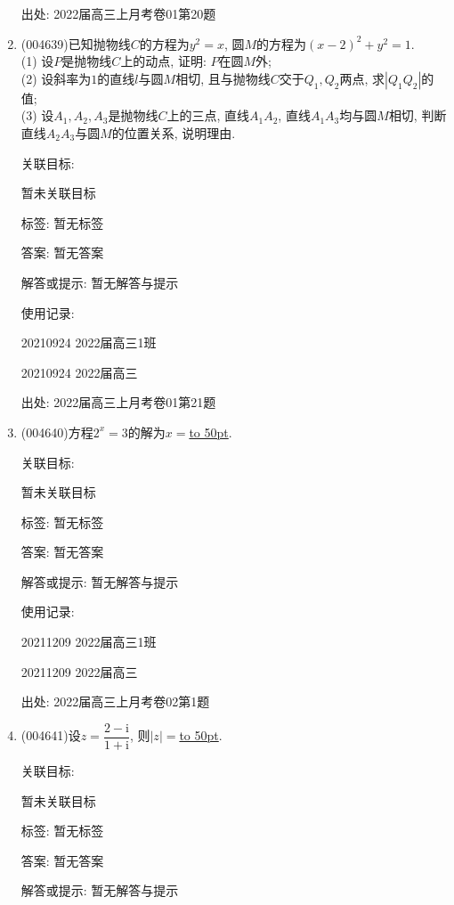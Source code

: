 \documentclass[10pt,a4paper]{article}
\newcommand{\blank}[1]{\underline{\hbox to #1pt{}}}
\begin{document}
\begin{enumerate}[1.]
出处: 2022届高三上月考卷01第20题
\item { (004639)}已知抛物线$C$的方程为$y^2=x$, 圆$M$的方程为$(x-2)^2+y^2=1$.\\
(1) 设$P$是抛物线$C$上的动点, 证明: $P$在圆$M$外;\\
(2) 设斜率为$1$的直线$l$与圆$M$相切, 且与抛物线$C$交于$Q_1,Q_2$两点, 求$|Q_1Q_2|$的值;\\
(3) 设$A_1,A_2,A_3$是抛物线$C$上的三点, 直线$A_1A_2$, 直线$A_1A_3$均与圆$M$相切, 判断直线$A_2A_3$与圆$M$的位置关系, 说明理由.


关联目标:

暂未关联目标



标签: 暂无标签

答案: 暂无答案

解答或提示: 暂无解答与提示

使用记录:

20210924	2022届高三1班			

20210924	2022届高三			


出处: 2022届高三上月考卷01第21题
\item { (004640)}方程$2^x=3$的解为$x=$\blank{50}.


关联目标:

暂未关联目标



标签: 暂无标签

答案: 暂无答案

解答或提示: 暂无解答与提示

使用记录:

20211209	2022届高三1班	

20211209	2022届高三	


出处: 2022届高三上月考卷02第1题
\item { (004641)}设$z=\dfrac{2-\mathrm{i}}{1+\mathrm{i}}$, 则$|z|=$\blank{50}.


关联目标:

暂未关联目标



标签: 暂无标签

答案: 暂无答案

解答或提示: 暂无解答与提示


\end{enumerate}
\end{document}

